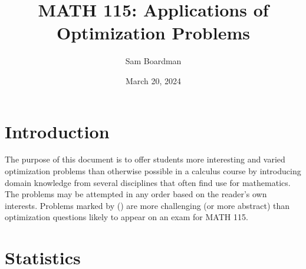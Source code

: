 \documentclass{article}
\title{MATH 115: Applications of Optimization Problems}
\author{Sam Boardman}
\date{March 20, 2024}
\begin{document}
\maketitle

\section{Introduction}

The purpose of this document is to offer students more interesting and varied optimization problems than otherwise possible in a calculus course by introducing domain knowledge from several disciplines that often find use for mathematics. The problems may be attempted in any order based on the reader's own interests. Problems marked by (\textasteriskcentered{}) are more challenging (or more abstract) than optimization questions likely to appear on an exam for MATH 115. 

\newpage

\section{Statistics}
\end{document}
